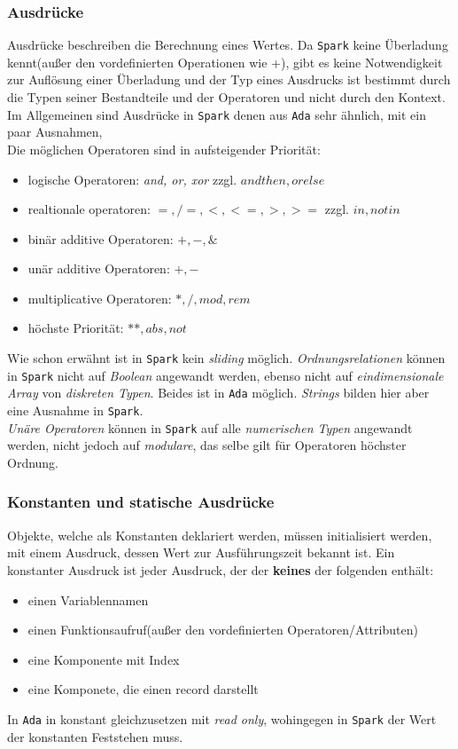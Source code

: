 \subsubsection{Ausdrücke}
\label{subsubsec:Ausdruecke}
Ausdrücke beschreiben die Berechnung eines Wertes. Da \texttt{Spark} keine Überladung kennt(außer den vordefinierten Operationen wie +), gibt es keine Notwendigkeit zur Auflösung einer Überladung und der Typ eines Ausdrucks ist bestimmt durch die Typen seiner Bestandteile und der Operatoren und nicht durch den Kontext. Im Allgemeinen sind Ausdrücke in \texttt{Spark} denen aus \texttt{Ada} sehr ähnlich, mit ein paar Ausnahmen,\\
Die möglichen Operatoren sind in aufsteigender Priorität:
\begin{itemize}
	\item logische Operatoren: \textit{and, or, xor} zzgl. $and then, or else$
	\item realtionale operatoren: $=, /=, <, <=,> ,>=$ zzgl. $in, not in$
	\item binär additive Operatoren: $+, - , \&$
	\item unär additive Operatoren: $+, -$
	\item multiplicative Operatoren: $*, /, mod, rem$
	\item höchste Priorität: $**, abs, not$
\end{itemize}
Wie schon erwähnt ist in \texttt{Spark} kein \textit{sliding} möglich. \textit{Ordnungsrelationen} können in \texttt{Spark} nicht auf \textit{Boolean} angewandt werden, ebenso nicht auf \textit{eindimensionale Array} von \textit{diskreten Typen}. Beides ist in \texttt{Ada} möglich. \textit{Strings} bilden hier aber eine Ausnahme in \texttt{Spark}.\\
\textit{Unäre Operatoren} können in \texttt{Spark} auf alle \textit{numerischen Typen} angewandt werden, nicht jedoch auf \textit{modulare}, das selbe gilt für Operatoren höchster Ordnung.


\subsubsection{Konstanten und statische Ausdrücke}
\label{subsubsec:Konstanten und statische Ausdruecke}
Objekte, welche als Konstanten deklariert werden, müssen initialisiert werden, mit einem Ausdruck, dessen Wert zur Ausführungszeit bekannt ist. Ein konstanter Ausdruck ist jeder Ausdruck, der der \textbf{keines} der folgenden enthält:

\begin{itemize}
	\item einen Variablennamen
	\item einen Funktionsaufruf(außer den vordefinierten Operatoren/Attributen)
	\item eine Komponente mit Index
	\item eine Komponete, die einen record darstellt
\end{itemize}

In \texttt{Ada} in konstant gleichzusetzen mit \textit{read only}, wohingegen in \texttt{Spark} der Wert der konstanten Feststehen muss. 

